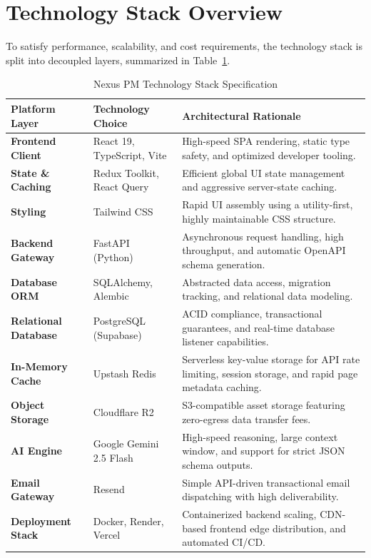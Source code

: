 \pagebreak
\section{Technology Stack Overview}
To satisfy performance, scalability, and cost requirements, the technology stack is split into decoupled layers, summarized in Table~\ref{tab:tech_stack}.

\begin{table}[h!]
\centering
\renewcommand{\arraystretch}{1.4}
\begin{tabularx}{\textwidth}{l X X}
    \toprule[1.5pt]
    \rowcolor{primary!5}
    \textbf{\color{primary}Platform Layer} & \textbf{\color{primary}Technology Choice} & \textbf{\color{primary}Architectural Rationale} \\
    \midrule
    \textbf{Frontend Client} & React 19, TypeScript, Vite & High-speed SPA rendering, static type safety, and optimized developer tooling. \\
    \textbf{State \& Caching} & Redux Toolkit, React Query & Efficient global UI state management and aggressive server-state caching. \\
    \textbf{Styling} & Tailwind CSS & Rapid UI assembly using a utility-first, highly maintainable CSS structure. \\
    \textbf{Backend Gateway} & FastAPI (Python) & Asynchronous request handling, high throughput, and automatic OpenAPI schema generation. \\
    \textbf{Database ORM} & SQLAlchemy, Alembic & Abstracted data access, migration tracking, and relational data modeling. \\
    \textbf{Relational Database} & PostgreSQL (Supabase) & ACID compliance, transactional guarantees, and real-time database listener capabilities. \\
    \textbf{In-Memory Cache} & Upstash Redis & Serverless key-value storage for API rate limiting, session storage, and rapid page metadata caching. \\
    \textbf{Object Storage} & Cloudflare R2 & S3-compatible asset storage featuring zero-egress data transfer fees. \\
    \textbf{AI Engine} & Google Gemini 2.5 Flash & High-speed reasoning, large context window, and support for strict JSON schema outputs. \\
    \textbf{Email Gateway} & Resend & Simple API-driven transactional email dispatching with high deliverability. \\
    \textbf{Deployment Stack} & Docker, Render, Vercel & Containerized backend scaling, CDN-based frontend edge distribution, and automated CI/CD. \\
    \bottomrule[1.5pt]
\end{tabularx}
\caption{Nexus PM Technology Stack Specification}
\label{tab:tech_stack}
\end{table}

